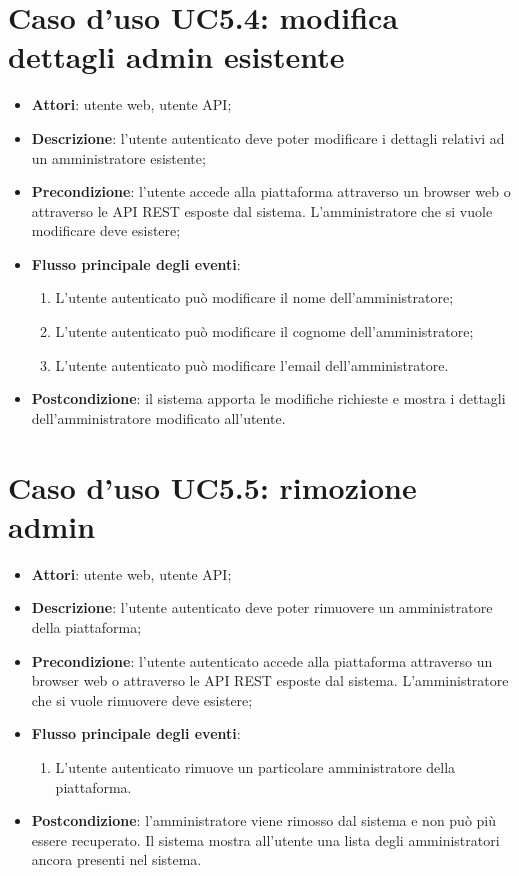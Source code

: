 \section{Caso d'uso UC5.4: modifica dettagli admin esistente}
\begin{itemize}
\item \textbf{Attori}: utente web, utente API;
\item \textbf{Descrizione}: l'utente autenticato deve poter modificare i dettagli relativi ad un amministratore esistente; 
      \item \textbf{Precondizione}: l'utente accede alla piattaforma attraverso un browser web o attraverso le API REST esposte dal sistema. L'amministratore che si vuole modificare deve esistere;

        \item \textbf{Flusso principale degli eventi}:
          \begin{enumerate}
          \item L'utente autenticato può modificare il nome dell'amministratore;
          \item L'utente autenticato può modificare il cognome dell'amministratore;
          \item L'utente autenticato può modificare l'email dell'amministratore.

      \end{enumerate}
    \item \textbf{Postcondizione}: il sistema apporta le modifiche richieste e mostra i dettagli dell'amministratore modificato all'utente.
  \end{itemize}
\hypertarget{UC5.5}{}
\section{Caso d'uso UC5.5: rimozione admin}
\begin{itemize}
\item \textbf{Attori}: utente web, utente API;
\item \textbf{Descrizione}: l'utente autenticato deve poter rimuovere un amministratore della piattaforma; 
      \item \textbf{Precondizione}: l'utente autenticato accede alla piattaforma attraverso un browser web o attraverso le API REST esposte dal sistema. L'amministratore che si vuole rimuovere deve esistere;

        \item \textbf{Flusso principale degli eventi}:
          \begin{enumerate}
          \item L'utente autenticato rimuove un particolare amministratore della piattaforma.

      \end{enumerate}
    \item \textbf{Postcondizione}: l'amministratore viene rimosso dal sistema e non può più essere recuperato. Il sistema mostra all'utente una lista degli amministratori ancora presenti nel sistema.
  \end{itemize}
\hypertarget{UC6}{}

